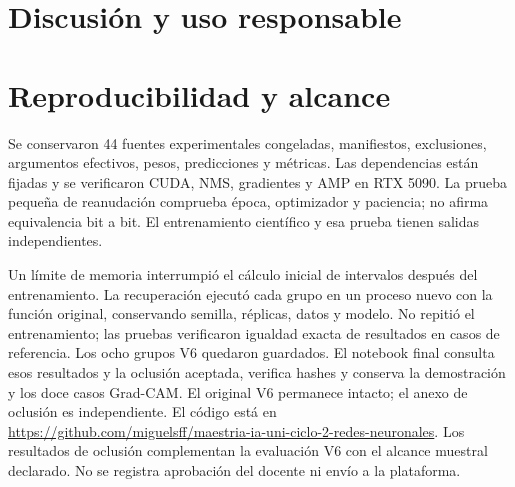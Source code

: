 \section{Discusión y uso responsable}


\section{Reproducibilidad y alcance}
Se conservaron 44 fuentes experimentales congeladas, manifiestos, exclusiones,
argumentos efectivos, pesos, predicciones y métricas. Las dependencias están fijadas
 y se verificaron CUDA, NMS, gradientes y AMP en RTX 5090. La prueba pequeña de
reanudación comprueba época, optimizador y paciencia; no afirma equivalencia bit a bit.
El entrenamiento científico y esa prueba tienen salidas independientes.

Un límite de memoria interrumpió el cálculo inicial de intervalos después del
entrenamiento. La recuperación ejecutó cada grupo en un proceso nuevo con la función
original, conservando semilla, réplicas, datos y modelo. No repitió el entrenamiento;
las pruebas verificaron igualdad exacta de resultados en casos de referencia.
Los ocho grupos V6 quedaron guardados. El notebook final consulta esos resultados
y la oclusión aceptada, verifica hashes y conserva la demostración y los doce casos
Grad-CAM. El original V6 permanece intacto; el anexo de oclusión es independiente.
El código está en \url{https://github.com/miguelsff/maestria-ia-uni-ciclo-2-redes-neuronales}.
Los resultados de oclusión complementan la evaluación V6 con el alcance muestral
declarado. No se registra aprobación del docente ni envío a la plataforma.




